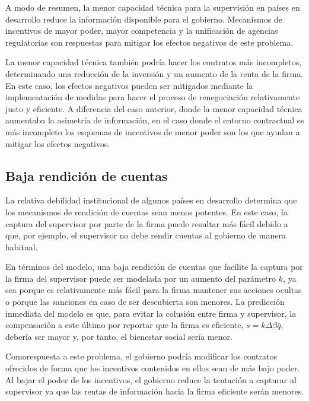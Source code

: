 \documentclass[
  12pt,
  spanish,
]{book}
\begin{document}
A modo de resumen, la menor capacidad técnica para la supervisión en
países en desarrollo reduce la información disponible para el gobierno.
Mecanismos de incentivos de mayor poder, mayor competencia y la
unificación de agencias regulatorias son respuestas para mitigar los
efectos negativos de este problema.

La menor capacidad técnica también podría hacer los contratos más
incompletos, determinando una reducción de la inversión y un aumento de
la renta de la firma. En este caso, los efectos negativos pueden ser
mitigados mediante la implementación de medidas para hacer el proceso de
renegociación relativamente justo y eficiente. A diferencia del caso
anterior, donde la menor capacidad técnica aumentaba la asimetría de
información, en el caso donde el entorno contractual es más incompleto
los esquemas de incentivos de menor poder son los que ayudan a mitigar
los efectos negativos.

\hypertarget{rendicion}{%
\subsection{Baja rendición de cuentas}\label{rendicion}}

La relativa debilidad institucional de algunos países en desarrollo
determina que los mecanismos de rendición de cuentas sean menos
potentes. En este caso, la captura del supervisor por parte de la firma
puede resultar más fácil debido a que, por ejemplo, el supervisor no
debe rendir cuentas al gobierno de manera habitual.

En términos del modelo, una baja rendición de cuentas que facilite la
captura por la firma del supervisor puede ser modelada por un aumento
del parámetro \(k\), ya sea porque es relativamente más fácil para la
firma mantener sus acciones ocultas o porque las sanciones en caso de
ser descubierta son menores. La predicción inmediata del modelo es que,
para evitar la colusión entre firma y supervisor, la compensación a este
último por reportar que la firma es eficiente, \(s = kΔβ \overline q\),
debería ser mayor y, por tanto, el bienestar social sería menor.

Comorespuesta a este problema, el gobierno podría modificar los
contratos ofrecidos de forma que los incentivos contenidos en ellos sean
de más bajo poder. Al bajar el poder de los incentivos, el gobierno
reduce la tentación a capturar al supervisor ya que las rentas de
información hacia la firma eficiente serán menores.
\end{document}
